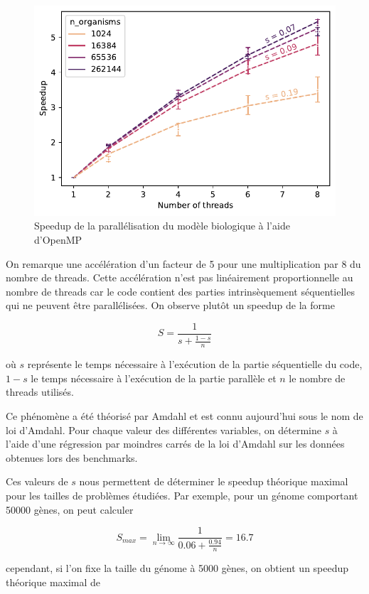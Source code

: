 \documentclass[a4paper, 10pt, twoside]{article}
\begin{document}
\begin{figure}[htbp]
\begin{minipage}{0.32\textwidth}
		\includegraphics[width=\textwidth]{img/speedup_n_organisms.pdf}
	\end{minipage}
	\caption{Speedup de la parallélisation du modèle biologique à l'aide d'OpenMP}
	\label{fig:speedup/omp}
\end{figure}

On remarque une accélération d'un facteur de 5 pour une multiplication par 8 du nombre de threads. Cette accélération n'est pas linéairement proportionnelle au nombre de threads car le code contient des parties intrinsèquement séquentielles qui ne peuvent être parallélisées. On observe plutôt un speedup de la forme

$$ S = \frac{1}{s + \frac{1-s}{n}} $$

où $s$ représente le temps nécessaire à l'exécution de la partie séquentielle du code, $1-s$ le temps nécessaire à l'exécution de la partie parallèle et $n$ le nombre de threads utilisés.

Ce phénomène a été théorisé par Amdahl \cite{amdahl2007validity} et est connu aujourd'hui sous le nom de loi d'Amdahl.
Pour chaque valeur des différentes variables, on détermine $s$ à l'aide d'une régression par moindres carrés de la loi d'Amdahl sur les données obtenues lors des benchmarks.

Ces valeurs de $s$ nous permettent de déterminer le speedup théorique maximal pour les tailles de problèmes étudiées. Par exemple, pour un génome comportant 50000 gènes, on peut calculer

$$ S_{max} = \lim_{n\to\infty} \frac{1}{0.06 + \frac{0.94}{n}} = 16.7 $$

cependant, si l'on fixe la taille du génome à 5000 gènes, on obtient un speedup théorique maximal de
\end{document}
